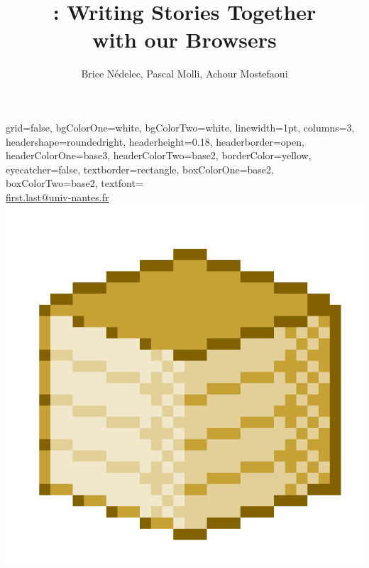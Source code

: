 \documentclass[a1paper, fontscale=0.38, portrait]{baposter}
\title{\CRATE: Writing Stories Together\vspace{0.4em} \\ with our Browsers}
\author{Brice Nédelec, Pascal Molli, Achour Mostefaoui}
\begin{document}
\begin{poster}{
    grid=false,
    bgColorOne=white,
    bgColorTwo=white,
    linewidth=1pt,
    columns=3,
    headershape=roundedright, 
    headerheight=0.18\textheight,
    headerborder=open,
    headerColorOne=base3,
    headerColorTwo=base2,
    borderColor=yellow,
    eyecatcher=false,
    textborder=rectangle,
    boxColorOne=base2,
    boxColorTwo=base2,
    textfont=\sffamily
  }
  {}
  {\huge\textsc{\thetitle}\vspace{0.6em}}
  {\theauthor \\ \url{first.last@univ-nantes.fr}}
  {\includegraphics[height=0.16\textheight, interpolate=false]{logos/crateicon.png}}


\end{poster}
\end{document}
